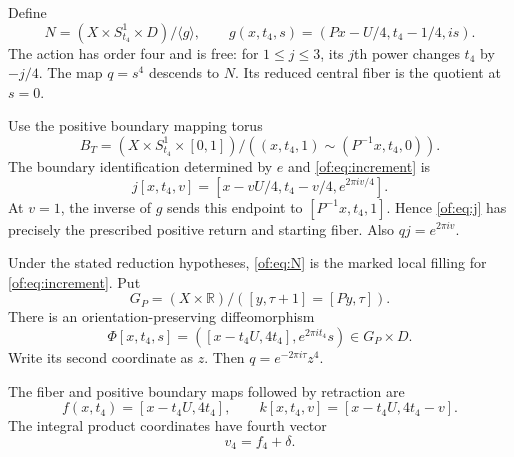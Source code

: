 Define
\begin{equation}\label{of:eq:N}
 N=(X\times S^1_{t_4}\times D)/\langle g\rangle,
 \qquad g(x,t_4,s)=(Px-U/4,t_4-1/4,is).
\end{equation}
The action has order four and is free: for $1\le j\le3$, its $j$th power
changes $t_4$ by $-j/4$. The map $q=s^4$ descends to $N$.
Its reduced central fiber is the quotient at $s=0$.

Use the positive boundary mapping torus
\[
 B_T=(X\times S^1_{t_4}\times[0,1])/
 ((x,t_4,1)\sim(P^{-1}x,t_4,0)).
\]
The boundary identification determined by $e$ and \eqref{of:eq:increment} is
\begin{equation}\label{of:eq:j}
 j[x,t_4,v]=[x-vU/4,t_4-v/4,e^{2\pi iv/4}].
\end{equation}
At $v=1$, the inverse of $g$ sends this endpoint to
$[P^{-1}x,t_4,1]$. Hence \eqref{of:eq:j} has precisely the prescribed
positive return and starting fiber. Also $qj=e^{2\pi iv}$.

\begin{theorem}\label{of:thm:geometry}
Under the stated reduction hypotheses, \eqref{of:eq:N} is the marked
local filling for \eqref{of:eq:increment}.
Put
\[
 G_P=(X\times\mathbb R)/([y,\tau+1]=[Py,\tau]).
\]
There is an orientation-preserving diffeomorphism
\begin{equation}\label{of:eq:Phi}
 \Phi[x,t_4,s]=([x-t_4U,4t_4],e^{2\pi it_4}s)
                 \in G_P\times D.
\end{equation}
Write its second coordinate as $z$.
Then $q=e^{-2\pi i\tau}z^4$.

The fiber and positive boundary maps followed by retraction are
\begin{equation}\label{of:eq:fk}
 f(x,t_4)=[x-t_4U,4t_4],\qquad
 k[x,t_4,v]=[x-t_4U,4t_4-v].
\end{equation}
The integral product coordinates have fourth vector
\begin{equation}\label{of:eq:v4}
                         v_4=f_4+\delta.
\end{equation}
\end{theorem}

